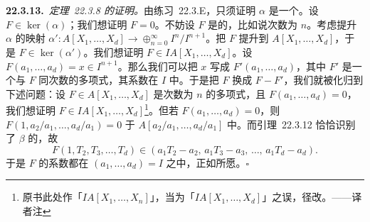\textbf{22.3.13.}\ \emph{\mbox{定理~22.3.8} 的证明。}\quad 由\mbox{练习~22.3.E}，只须证明\trSurjectiveMap{} $\alpha$ 是一个\trIsomorphism。设 $F\in\ker(\alpha)$；我们想证明 $F=0$。不妨设 $F$ 是\trHomogeneous{}的，比如说次数为 $n$。考虑提升 $\alpha$ 的映射 $\alpha'\colon A[X_1,\dots,X_d]\to\oplus_{n=0}^{\infty}I^n/I^{n+1}$。把 $F$ 提升到 $A[X_1,\dots,X_d]$，于是 $F\in\ker(\alpha')$。我们想证明 $F\in IA[X_1,\dots,X_d]$。设 $F(a_1,\dots,a_d)=x\in I^{n+1}$。那么我们可以把 $x$ 写成 $F'(a_1,\dots,a_d)$，其中 $F'$ 是一个与 $F$ 同次数的\trHomogeneous{}多项式，其系数在 $I$ 中。于是把 $F$ 换成 $F-F'$，我们就被化归到下述问题：设 $F\in A[X_1,\dots,X_d]$ 是次数为 $n$ 的\trHomogeneous{}多项式，且 $F(a_1,\dots,a_d)=0$，我们想证明 $F\in IA[X_1,\dots,X_d]$\footnote{原书此处作「$IA[X_1,\dots,X_n]$」，当为「$IA[X_1,\dots,X_d]$」之误，径改。——译者注}。但若 $F(a_1,\dots,a_d)=0$，则 $F(1,a_2/a_1,\dots,a_d/a_1)=0$ 于 $A[a_2/a_1,\dots,a_d/a_1]$ 中。而\mbox{引理~22.3.12} 恰恰识别了 $\beta$ 的\trKernel，故
\[
F(1,T_2,T_3,\dots,T_d)\in(a_1T_2-a_2,\,a_1T_3-a_3,\,\dots,\,a_1T_d-a_d).
\]
于是 $F$ 的系数都在 $(a_1,\dots,a_d)=I$ 之中，正如所愿。\hfill$\square$

